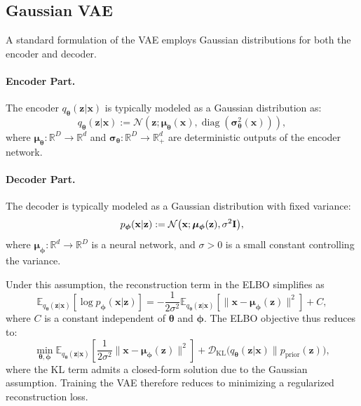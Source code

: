 

\subsection{Gaussian VAE}\label{subsec:optimization-vae}
A standard formulation of the VAE employs Gaussian distributions for both the encoder and decoder.
\paragraph{Encoder Part.}
The encoder $ q_{\bm{\theta}}(\mathbf{z} | \mathbf{x}) $ is typically modeled as a Gaussian distribution as:
\[
q_{\bm{\theta}}(\mathbf{z} | \mathbf{x}) := \mathcal{N}\left(\mathbf{z}; \bm{\mu}_{\bm{\theta}}(\mathbf{x}), \operatorname{diag}(\bm{\sigma}_{\bm{\theta}}^2(\mathbf{x}))\right),
\]
where $\bm{\mu}_{\bm{\theta}} : \mathbb{R}^D \to \mathbb{R}^d$ and $\bm{\sigma}_{\bm{\theta}} : \mathbb{R}^D \to \mathbb{R}_+^d$ are deterministic outputs of the encoder network.
\paragraph{Decoder Part.} The decoder is typically modeled as a Gaussian distribution with fixed variance:
\[
p_{\bm{\phi}}(\mathbf{x}|\mathbf{z}) := \mathcal{N}\bigl(\mathbf{x}; \bm{\mu}_{\bm{\phi}}(\mathbf{z}), \sigma^2 {\mathbf{I}}\bigr),
\]
where $\bm{\mu}_{\bm{\phi}} : \mathbb{R}^d \to \mathbb{R}^D$ is a neural network, and $\sigma > 0$ is a small constant controlling the variance.
 
Under this assumption, the reconstruction term in the ELBO simplifies as
\[
\mathbb{E}_{q_{\bm{\theta}}(\mathbf{z} | \mathbf{x})} \left[\log p_{\bm{\phi}}(\mathbf{x} | \mathbf{z})\right]
= - \frac{1}{2\sigma^2} \mathbb{E}_{q_{\bm{\theta}}(\mathbf{z} | \mathbf{x})} \left[\|\mathbf{x} - \bm{\mu}_{\bm{\phi}}(\mathbf{z})\|^2\right] + C,
\]
where $C$ is a constant independent of $\bm{\theta}$ and $\bm{\phi}$. The ELBO objective thus reduces to:
\[
\min_{\bm{\theta}, \bm{\phi}}  \mathbb{E}_{q_{\bm{\theta}}(\mathbf{z} | \mathbf{x})} \left[ \frac{1}{2\sigma^2} \|\mathbf{x} - \bm{\mu}_{\bm{\phi}}(\mathbf{z})\|^2 \right]
+ \mathcal{D}_{\mathrm{KL}}\big(q_{\bm{\theta}}(\mathbf{z} | \mathbf{x}) \| p_{\mathrm{prior}}(\mathbf{z})\big),
\]
where the KL term admits a closed-form solution due to the Gaussian assumption. Training the VAE therefore reduces to minimizing a regularized reconstruction loss.

